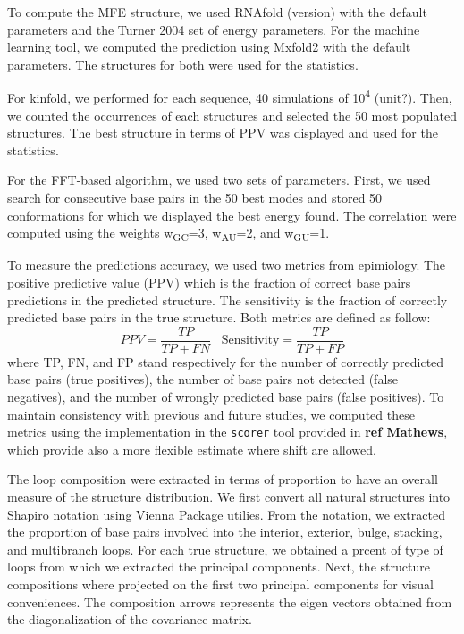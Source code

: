 \documentclass[a4paper,12pt]{article}
\begin{document}
{{To compute the MFE structure, we used RNAfold (version) with the default
parameters and the Turner 2004 set of energy parameters. For the machine
learning tool, we computed the prediction using Mxfold2 with the default
parameters. The structures for both were used for the statistics.

For kinfold, we performed for each sequence, 40 simulations of 10\textsuperscript{4} (unit?).
Then, we counted the occurrences of each structures and selected the 50 most
populated structures. The best structure in terms of PPV was displayed and used
for the statistics.

For the FFT-based algorithm, we used two sets of parameters. First, we used
search for consecutive base pairs in the 50 best modes and stored 50
conformations for which we displayed the best energy found. The correlation were
computed using the weights w\textsubscript{GC}=3, w\textsubscript{AU}=2, and w\textsubscript{GU}=1.

To measure the predictions accuracy, we used two metrics from epimiology. The
positive predictive value (PPV) which is the fraction of correct base pairs
predictions in the predicted structure. The sensitivity is the fraction of
correctly predicted base pairs in the true structure. Both metrics are defined
as follow:
\begin{equation}
PPV = \frac{TP}{TP + FN} \;\;\; \text{Sensitivity} = \frac{TP}{TP+FP}
\end{equation}
where TP, FN, and FP stand respectively for the number of correctly predicted
base pairs (true positives), the number of base pairs not detected (false
negatives), and the number of wrongly predicted base pairs (false positives). To
maintain consistency with previous and future studies, we computed these metrics
using the implementation in the \texttt{scorer} tool provided in \textbf{ref Mathews}, which
provide also a more flexible estimate where shift are allowed.

The loop composition were extracted in terms of proportion to have an overall
measure of the structure distribution. We first convert all natural structures
into Shapiro notation using Vienna Package utilies. From the notation, we
extracted the proportion of base pairs involved into the interior, exterior,
bulge, stacking, and multibranch loops. For each true structure, we obtained a
prcent of type of loops from which we extracted the principal components. Next,
the structure compositions where projected on the first two principal components
for visual conveniences. The composition arrows represents the eigen vectors
obtained from the diagonalization of the covariance matrix.

}}
\end{document}
